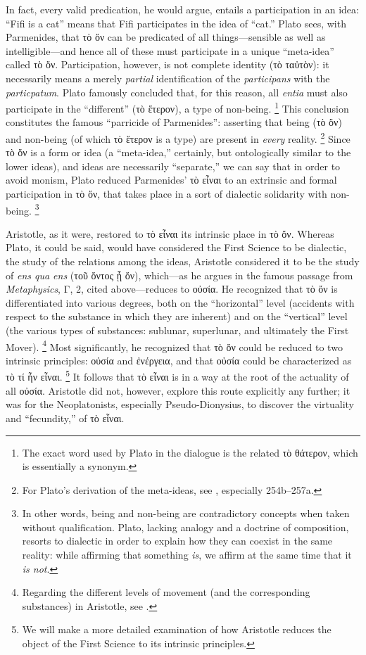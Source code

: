 %
In fact, every valid predication, he would argue, entails a participation in an idea: “Fifi is a cat” means that Fifi participates in the idea of “cat.” Plato sees, with Parmenides, that τὸ ὄν can be predicated of all things—sensible as well as intelligible—and hence all of these must participate in a unique “meta-idea” called τὸ ὄν. Participation, however, is not complete identity (τὸ ταὐτὸν): it necessarily means a merely \emph{partial} identification of the \emph{participans} with the \emph{particpatum}. Plato famously concluded that, for this reason, all \emph{entia} must also participate in the “different” (τὸ ἕτερον), a type of non-being.%
%
\footnote{The exact word used by Plato in the dialogue is the related τὸ θάτερον, which is essentially a synonym.} This conclusion constitutes the famous “parricide of Parmenides”: asserting that being (τὸ ὄν) and non-being (of which τὸ ἕτερον is a type) are present in \emph{every} reality.%
%
\footnote{For Plato’s derivation of the meta-ideas, see \cite[251b–259a]{plato:sophist}, especially 254b–257a.}
%
Since τὸ ὄν is a form or idea (a “meta-idea,” certainly, but ontologically similar to the lower ideas), and ideas are necessarily “separate,” we can say that in order to avoid monism, Plato reduced Parmenides’ τὸ εἶναι to an extrinsic and formal participation in τὸ ὄν, that takes place in a sort of dialectic solidarity with non-being.%
%
\footnote{In other words, being and non-being are contradictory concepts when taken without qualification. Plato, lacking analogy and a doctrine of composition, resorts to dialectic in order to explain how they can coexist in the same reality: while affirming that something \emph{is}, we affirm at the same time that it \emph{is not}.}

Aristotle, as it were, restored to τὸ εἶναι its intrinsic place in τὸ ὄν. Whereas Plato, it could be said, would have considered the First Science to be dialectic, the study of the relations among the ideas, Aristotle considered it to be the study of \emph{ens qua ens} (τοῦ ὄντος ᾗ ὄν), which—as he argues in the famous passage from \emph{Metaphysics}, Γ, 2, cited above—reduces to οὐσία. He recognized that τὸ ὄν is differentiated into various degrees, both on the “horizontal” level (accidents with respect to the substance in which they are inherent) and on the “vertical” level (the various types of substances: sublunar, superlunar, and ultimately the First Mover).%
%
\footnote{Regarding the different levels of movement (and the corresponding substances) in Aristotle, see \cite[401–402]{mitchell:four}.}
%
Most significantly, he recognized that τὸ ὄν could be reduced to two intrinsic principles: οὐσία and ἐνέργεια, and that οὐσία could be characterized as τὸ τί ἦν εἶναι.%
%
\footnote{We will make a more detailed examination of how Aristotle reduces the object of the First Science to its intrinsic principles.} It follows that τὸ εἶναι is in a way at the root of the actuality of all οὐσία.  Aristotle did not, however, explore this route explicitly any further; it was for the Neoplatonists, especially Pseudo-Dionysius, to discover the virtuality and “fecundity,” of τὸ εἶναι.

